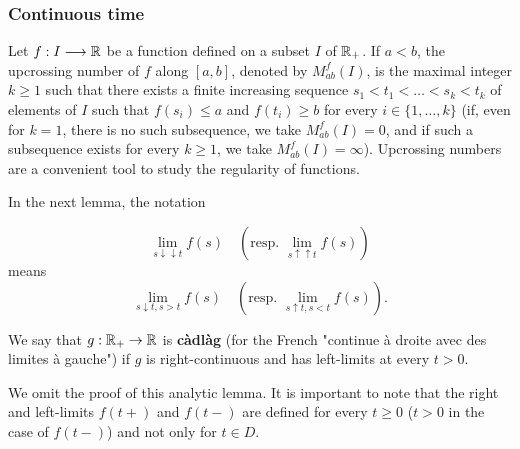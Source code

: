 \documentclass[../Main.tex]{subfiles}
\begin{document}

\subsubsection{Continuous time}
Let $f : I \longrightarrow \mathbb{R}$ be a function defined on a subset $I$ of $\mathbb{R}_+$. If $a < b$, the upcrossing number of $f$ along $[a, b]$, denoted by $M_{ab}^f(I)$, is the maximal integer $k \geq 1$ such that there exists a finite increasing sequence $s_1 < t_1 < \dots < s_k < t_k$ of elements of $I$ such that $f(s_i) \leq a$ and $f(t_i) \geq b$ for every $i \in \{1, \dots, k\}$ (if, even for $k = 1$, there is no such subsequence, we take $M_{ab}^f(I) = 0$, and if such a subsequence exists for every $k \geq 1$, we take $M_{ab}^f(I) = \infty$). Upcrossing numbers are a convenient tool to study the regularity of functions.

In the next lemma, the notation

$$\lim_{s \downarrow \downarrow t} f(s) \quad (\text{resp. } \lim_{s \uparrow \uparrow t} f(s) )$$
means
$$\lim_{s \downarrow t, s > t} f(s) \quad (\text{resp. } \lim_{s \uparrow t, s < t} f(s) ).$$

We say that $g : \mathbb{R}_+ \to \mathbb{R}$ is \textbf{càdlàg} (for the French "continue à droite avec des limites à gauche") if $g$ is right-continuous and has left-limits at every $t > 0$.

We omit the proof of this analytic lemma. It is important to note that the right and left-limits $f(t+)$ and $f(t-)$ are defined for every $t \geq 0$ ($t > 0$ in the case of $f(t-)$) and not only for $t \in D$.
\end{document}
